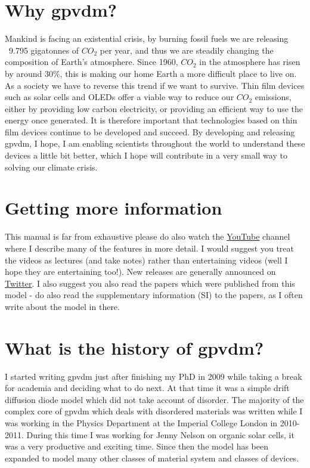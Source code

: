 \section{Why gpvdm?}
Mankind is facing an existential crisis, by burning fossil fuels we are releasing ~9.795 gigatonnes of $CO_2$ per year, and thus we are steadily changing the composition of Earth's atmosphere. Since 1960, $CO_{2}$ in the atmosphere has risen by around 30\%, this is making our home Earth a more difficult place to live on. As a society we have to reverse this trend if we want to survive. Thin film devices such as solar cells and OLEDs offer a viable way to reduce our $CO_{2}$ emissions, either by providing low carbon electricity, or providing an efficient way to use the energy once generated. It is therefore important that technologies based on thin film devices continue to be developed and succeed. By developing and releasing gpvdm, I hope, I am enabling scientists throughout the world to understand these devices a little bit better, which I hope will contribute in a very small way to solving our climate crisis.



\section{Getting more information}
This manual is far from exhaustive please do also watch the \href{https://www.youtube.com/channel/UCbm_0AKX1SpbMMT7jilxFfA}{YouTube} channel where I describe many of the features in more detail. I would suggest you treat the videos as lectures (and take notes) rather than entertaining videos (well I hope they are entertaining too!). New releases are generally announced on \href{https://twitter.com/gpvdm_info}{Twitter}.  I also suggest you also read the papers which were published from this model - do also read the supplementary information (SI) to the papers, as I often write about the model in there.

\section{What is the history of gpvdm?}
I started writing gpvdm just after finishing my PhD in 2009 while taking a break for academia and deciding what to do next. At that time it was a simple drift diffusion diode model which did not take account of disorder. The majority of the complex core of gpvdm which deals with disordered materials was written while I was working in the Physics Department at the Imperial College London in 2010-2011. During this time I was working for Jenny Nelson on organic solar cells, it was a very productive and exciting time. Since then the model has been expanded to model many other classes of material system and classes of devices.

